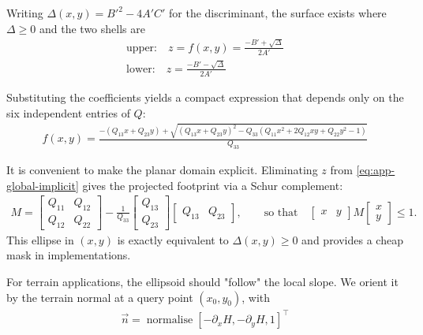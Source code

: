 Writing $\Delta(x,y)=B'^2-4A'C'$ for the discriminant, the surface exists where $\Delta\ge 0$ and the two shells are
\begin{align}
    \label{eq:app-upper}
    \text{upper:}\quad z = f(x,y) = \frac{-B' + \sqrt{ \Delta }}{ 2A' } \\
    \label{eq:app-lower}
    \text{lower:}\quad z = \frac{-B' - \sqrt{\Delta}}{2A'}
\end{align}

Substituting the coefficients yields a compact expression that depends only on the six independent entries of $Q$:
\begin{align}
    \label{eq:app-upper-final}
    f(x,y)=
    \frac{
    -(Q_{13}x+Q_{23}y)
    +\sqrt{(Q_{13}x+Q_{23}y)^2 - Q_{33} \left(Q_{11}x^2 + 2Q_{12}xy + Q_{22}y^2 - 1\right)}
    }{Q_{33}}
\end{align}


It is convenient to make the planar domain explicit. Eliminating $z$ from \cref{eq:app-global-implicit} gives the projected footprint via a Schur complement:
\begin{align}
    M =
    \begin{bmatrix}
    Q_{11} & Q_{12}\\
    Q_{12} & Q_{22}
    \end{bmatrix}
    -
    \frac{1}{Q_{33}}
    \begin{bmatrix}
    Q_{13}\\ Q_{23}
    \end{bmatrix}
    \begin{bmatrix}
    Q_{13} & Q_{23}
    \end{bmatrix},
    \qquad
    \text{so that}\quad
    \begin{bmatrix}x & y\end{bmatrix} M \begin{bmatrix}x\\ y\end{bmatrix} \le 1.
\end{align}
This ellipse in $(x,y)$ is exactly equivalent to $\Delta(x,y)\ge 0$ and provides a cheap mask in implementations.

For terrain applications, the ellipsoid should "follow" the local slope. We orient it by the terrain normal at a query point $(x_0,y_0)$, with
\begin{align}
    \label{eq:app-terrain-normal}
    \vec n=\operatorname{normalise} [-\partial_x H, -\partial_y H, 1]^\top
\end{align}

